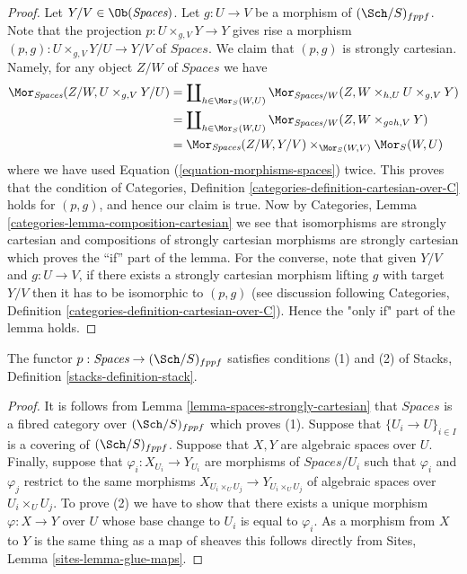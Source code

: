 \begin{proof}
Let $Y/V \in \Ob(\textit{Spaces})$.
Let $g : U \to V$ be a morphism of $(\Sch/S)_{fppf}$.
Note that the projection $p : U \times_{g, V} Y \to Y$
gives rise a morphism
$(p, g) : U \times_{g, V} Y/U \to Y/V$ of $\textit{Spaces}$.
We claim that $(p, g)$ is strongly cartesian.
Namely, for any object $Z/W$ of $\textit{Spaces}$ we have
\begin{align*}
\Mor_{\textit{Spaces}}(Z/W, U \times_{g, V} Y/U)
& =
\coprod\nolimits_{h \in \Mor_S(W, U)}
\Mor_{\textit{Spaces}/W}(Z, W \times_{h, U} U \times_{g, V} Y) \\
& =
\coprod\nolimits_{h \in \Mor_S(W, U)}
\Mor_{\textit{Spaces}/W}(Z, W \times_{g \circ h, V} Y) \\
& =
\Mor_{\textit{Spaces}}(Z/W, Y/V)
\times_{\Mor_S(W, V)} \Mor_S(W, U)
\end{align*}
where we have used Equation (\ref{equation-morphisms-spaces}) twice.
This proves that the condition of
Categories, Definition \ref{categories-definition-cartesian-over-C}
holds for $(p, g)$, and hence our claim is true. Now by
Categories, Lemma \ref{categories-lemma-composition-cartesian}
we see that isomorphisms are strongly cartesian and
compositions of strongly cartesian morphisms are strongly cartesian
which proves the ``if'' part of the lemma. For the converse, note
that given $Y/V$ and $g : U \to V$, if there exists a
strongly cartesian morphism lifting $g$ with target $Y/V$
then it has to be isomorphic to $(p, g)$ (see discussion following
Categories, Definition \ref{categories-definition-cartesian-over-C}).
Hence the "only if" part of the lemma holds.
\end{proof}

\begin{lemma}
\label{lemma-pre-stack-of-spaces}
The functor $p : \textit{Spaces} \to (\Sch/S)_{fppf}$
satisfies conditions (1) and (2) of
Stacks, Definition \ref{stacks-definition-stack}.
\end{lemma}

\begin{proof}
It is follows from
Lemma \ref{lemma-spaces-strongly-cartesian}
that $\textit{Spaces}$ is a fibred category over $(\Sch/S)_{fppf}$
which proves (1).
Suppose that $\{U_i \to U\}_{i \in I}$ is a covering of
$(\Sch/S)_{fppf}$. Suppose that $X, Y$ are algebraic spaces over
$U$. Finally, suppose that $\varphi_i : X_{U_i} \to Y_{U_i}$ are morphisms
of $\textit{Spaces}/U_i$ such that $\varphi_i$ and $\varphi_j$ restrict
to the same morphisms $X_{U_i \times_U U_j} \to Y_{U_i \times_U U_j}$
of algebraic spaces over $U_i \times_U U_j$.
To prove (2) we have to show that there exists a unique morphism
$\varphi  : X \to Y$ over $U$ whose base change to $U_i$ is
equal to $\varphi_i$. As a morphism from $X$ to $Y$ is the same thing
as a map of sheaves this follows directly from
Sites, Lemma \ref{sites-lemma-glue-maps}.
\end{proof}

